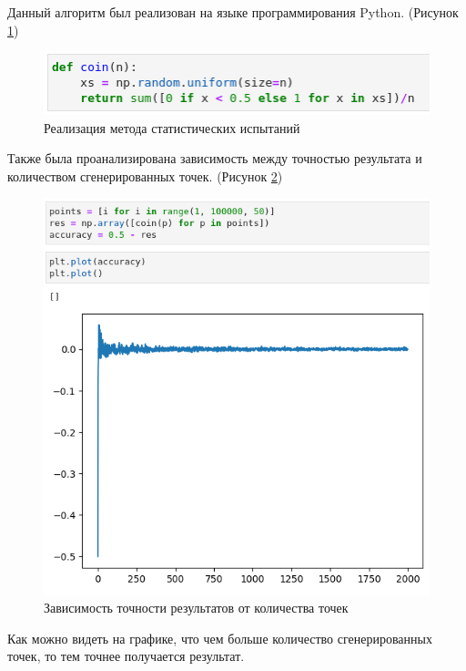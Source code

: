 \documentclass[14pt,fleqn]{extarticle}
\begin{document}
	Данный алгоритм был реализован на языке программирования Python. (Рисунок \ref{fig:coin_code})
	\begin{figure}[h]
		\centering \includegraphics[scale=0.65]{coin_code}
		\caption{Реализация метода статистических испытаний}
		\label{fig:coin_code}
	\end{figure}

	Также была проанализирована зависимость между точностью результата и количеством сгенерированных точек. (Рисунок \ref{fig:coin_result})
	\begin{figure}[h]
		\centering \includegraphics[scale=0.4]{coin_result}
		\caption{Зависимость точности результатов от количества точек}
		\label{fig:coin_result}
	\end{figure}

	Как можно видеть на графике, что чем больше количество сгенерированных точек, то тем точнее получается результат.
\end{document}
